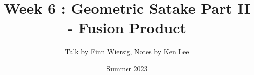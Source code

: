 \documentclass{article}
\begin{document}
\title{Week 6 : Geometric Satake Part II - Fusion Product}

\author{Talk by Finn Wiersig, Notes by Ken Lee}
\date{Summer 2023}
\maketitle

\tableofcontents  


\printbibliography
\end{document}
